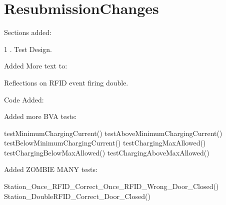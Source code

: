 \section{ResubmissionChanges}

Sections added:

1 . Test Design. 

Added More text to:

Reflections on RFID event firing double. 

Code Added: 

Added more BVA tests:

testMinimumChargingCurrent()
testAboveMinimumChargingCurrent()
testBelowMinimumChargingCurrent()
testChargingMaxAllowed()
testChargingBelowMaxAllowed()
testChargingAboveMaxAllowed()

Added ZOMBIE MANY tests: 

Station_Once_RFID_Correct_Once_RFID_Wrong_Door_Closed()
Station_DoubleRFID_Correct_Door_Closed()
